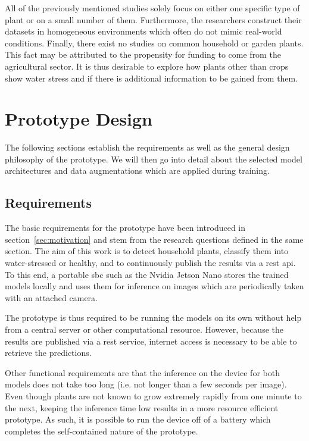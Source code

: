\documentclass[draft,final]{vutinfth} %
\begin{document}
All of the previously mentioned studies solely focus on either one
specific type of plant or on a small number of them. Furthermore, the
researchers construct their datasets in homogeneous environments which
often do not mimic real-world conditions. Finally, there exist no
studies on common household or garden plants. This fact may be
attributed to the propensity for funding to come from the agricultural
sector. It is thus desirable to explore how plants other than crops
show water stress and if there is additional information to be gained
from them.

\chapter{Prototype Design}
\label{chap:design}

The following sections establish the requirements as well as the
general design philosophy of the prototype. We will then go into
detail about the selected model architectures and data augmentations
which are applied during training.

\section{Requirements}
\label{sec:requirements}

The basic requirements for the prototype have been introduced in
section~\ref{sec:motivation} and stem from the research questions
defined in the same section. The aim of this work is to detect
household plants, classify them into water-stressed or healthy, and to
continuously publish the results via a \gls{rest} \gls{api}. To this
end, a portable \gls{sbc} such as the Nvidia Jetson Nano stores the
trained models locally and uses them for inference on images which are
periodically taken with an attached camera.

The prototype is thus required to be running the models on its own
without help from a central server or other computational
resource. However, because the results are published via a \gls{rest}
service, internet access is necessary to be able to retrieve the
predictions.

Other functional requirements are that the inference on the device for
both models does not take too long (i.e. not longer than a few seconds
per image). Even though plants are not known to grow extremely rapidly
from one minute to the next, keeping the inference time low results in
a more resource efficient prototype. As such, it is possible to run
the device off of a battery which completes the self-contained nature
of the prototype.
\end{document}
